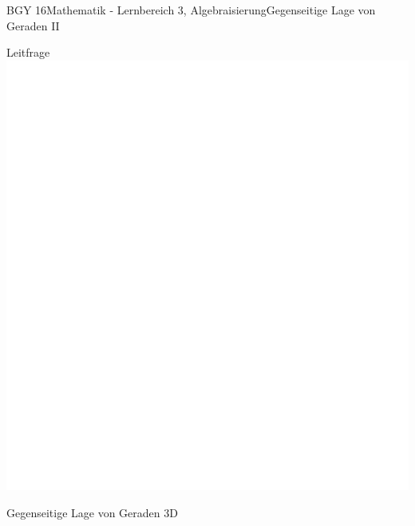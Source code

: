 \documentclass[oneside,openany,headings=optiontotoc,11pt,numbers=noenddot]{scrreprt}
\begin{document}
\begin{worksheet}{BGY 16}{Mathematik - Lernbereich 3, Algebraisierung}{Gegenseitige Lage von Geraden II}
\begin{framed}
		\end{framed}
		\begin{framed}
			\noindent
			\tiny{\color{codegray}Leitfrage}\\
			\includegraphics[scale=0.05]{../empty.jpg}
		\end{framed}
		\begin{framed}
			\tiny{\color{codegray}Gegenseitige Lage von Geraden 3D}
			\noindent
			\begin{center}
				\begin{tabularx}{\textwidth}{Xr}

\end{tabularx}
\end{center}
\end{framed}
\end{worksheet}
\end{document}
